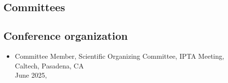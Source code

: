 \documentclass[11pt,letterpaper,sans,unicode]{moderncv}
\newcommand{\confitem}[3]{\item {#1}\\{#2}, #3}
\newcommand{\blucirc}{{\color{color1} $\circ\;\;$}}
\begin{document}
{

\subsection{Committees}

 \vspace{-0.1cm}

\subsection{Conference organization}
\begin{itemize}[leftmargin=8mm]
\confitem{Committee Member, Scientific Organizing Committee, IPTA Meeting, Caltech, Pasadena, CA}{June 2025}
\end{itemize}


}
\end{document}
